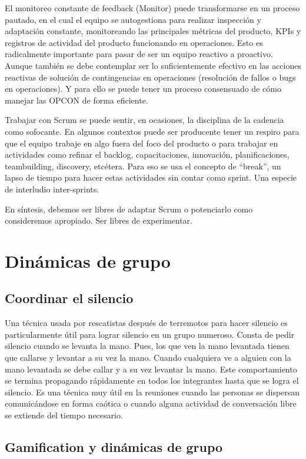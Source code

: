 El monitoreo constante de feedback (Monitor) puede transformarse en un proceso pautado, en el cual el equipo se autogestiona para realizar inspección y adaptación constante, monitoreando las principales métricas del producto, KPIs y registros de actividad del producto funcionando en operaciones. Esto es radicalmente importante para pasar de ser un equipo reactivo a proactivo. Aunque también se debe contemplar ser lo suficientemente efectivo en las acciones reactivas de solución de contingencias en operaciones (resolución de fallos o bugs en operaciones). Y para ello se puede tener un proceso consensuado de cómo manejar las OPCON de forma eficiente.

Trabajar con Scrum se puede sentir, en ocasiones, la disciplina de la cadencia como sofocante. En algunos contextos puede ser producente tener un respiro para que el equipo trabaje en algo fuera del foco del producto o para trabajar en actividades como refinar el backlog, capacitaciones, innovación, planificaciones, teambuilding, discovery, etcétera. Para eso se usa el concepto de “break”, un lapso de tiempo para hacer estas actividades sin contar como sprint. Una especie de interludio inter-sprints.

En síntesis, debemos ser libres de adaptar Scrum o potenciarlo como consideremos apropiado. Ser libres de experimentar.

\newpage
\section{Dinámicas de grupo}
\subsection{Coordinar el silencio}

Una técnica usada por rescatistas después de terremotos para hacer silencio es particularmente útil para lograr silencio en un grupo numeroso. Consta de pedir silencio cuando se levanta la mano. Pues, los que ven la mano levantada tienen que callarse y levantar a su vez la mano. Cuando cualquiera ve a alguien con la mano levantada se debe callar y a su vez levantar la mano. Este comportamiento se termina propagando rápidamente en todos los integrantes hasta que se logra el silencio. Es una técnica muy útil en la reuniones cuando las personas se dispersan comunicándose en forma caótica o cuando alguna actividad de conversación libre se extiende del tiempo necesario.

\subsection{Gamification y dinámicas de grupo}

